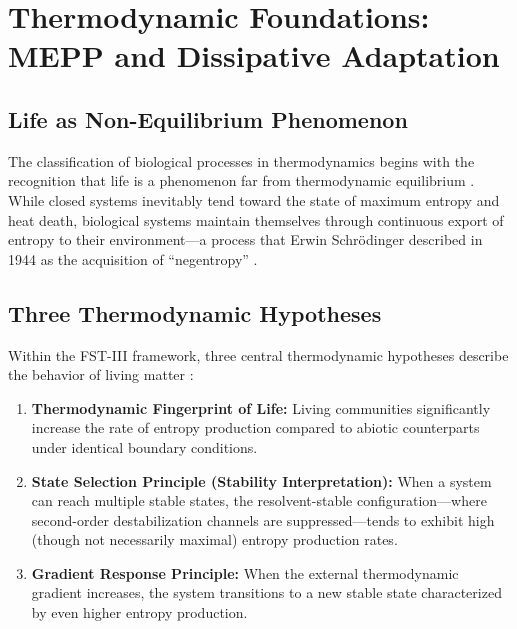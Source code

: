 \documentclass[12pt,a4paper]{article}
\theoremstyle{remark}
\begin{document}
\section{Thermodynamic Foundations: MEPP and Dissipative Adaptation}
\label{sec:thermodynamics}

\subsection{Life as Non-Equilibrium Phenomenon}

The classification of biological processes in thermodynamics begins with the recognition that life is a phenomenon far from thermodynamic equilibrium \citep{EcosystemMEPP}. While closed systems inevitably tend toward the state of maximum entropy and heat death, biological systems maintain themselves through continuous export of entropy to their environment---a process that Erwin Schr\"odinger described in 1944 as the acquisition of ``negentropy'' \citep{SchoolBiologicalPhysics,EcosystemMEPP}.

\subsection{Three Thermodynamic Hypotheses}

Within the FST-III framework, three central thermodynamic hypotheses describe the behavior of living matter \citep{EcosystemMEPP}:

\begin{enumerate}
    \item \textbf{Thermodynamic Fingerprint of Life:} Living communities significantly increase the rate of entropy production compared to abiotic counterparts under identical boundary conditions.

    \item \textbf{State Selection Principle (Stability Interpretation):} When a system can reach multiple stable states, the resolvent-stable configuration---where second-order destabilization channels are suppressed---tends to exhibit high (though not necessarily maximal) entropy production rates.

    \item \textbf{Gradient Response Principle:} When the external thermodynamic gradient increases, the system transitions to a new stable state characterized by even higher entropy production.
\end{enumerate}
\end{document}
